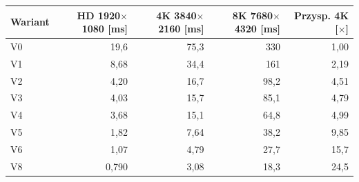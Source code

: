 \begin{tabular}{lrrrr}
\toprule
Wariant & HD 1920$\times$1080 [ms] & 4K 3840$\times$2160 [ms] & 8K 7680$\times$4320 [ms] & Przysp. 4K [$\times$] \\
\midrule
V0 & 19,6 & 75,3 & 330 & 1,00 \\
V1 & 8,68 & 34,4 & 161 & 2,19 \\
V2 & 4,20 & 16,7 & 98,2 & 4,51 \\
V3 & 4,03 & 15,7 & 85,1 & 4,79 \\
V4 & 3,68 & 15,1 & 64,8 & 4,99 \\
V5 & 1,82 & 7,64 & 38,2 & 9,85 \\
V6 & 1,07 & 4,79 & 27,7 & 15,7 \\
V8 & 0,790 & 3,08 & 18,3 & 24,5 \\
\bottomrule
\end{tabular}
